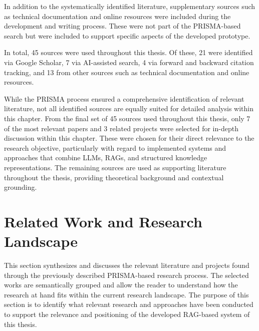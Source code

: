 In addition to the systematically identified literature, supplementary sources such as technical documentation and online resources were included during the development and writing process. These were not part of the PRISMA-based search but were included to support specific aspects of the developed prototype.

In total, 45 sources were used throughout this thesis. Of these, 21 were identified via Google Scholar, 7 via AI-assisted search, 4 via forward and backward citation tracking, and 13 from other sources such as technical documentation and online resources.

While the PRISMA process ensured a comprehensive identification of relevant literature, not all identified sources are equally suited for detailed analysis within this chapter. From the final set of 45 sources used throughout this thesis, only 7 of the most relevant papers and 3 related projects were selected for in-depth discussion within this chapter. These were chosen for their direct relevance to the research objective, particularly with regard to implemented systems and approaches that combine LLMs, RAGs, and structured knowledge representations. The remaining sources are used as supporting literature throughout the thesis, providing theoretical background and contextual grounding.



%
%


\section{Related Work and Research Landscape}
\label{sec:intro:relatedWork}
This section synthesizes and discusses the relevant literature and projects found through the previously described PRISMA-based research process. The selected works are semantically grouped and allow the reader to understand how the research at hand fits within the current research landscape. The purpose of this section is to identify what relevant research and approaches have been conducted to support the relevance and positioning of the developed RAG-based system of this thesis.


